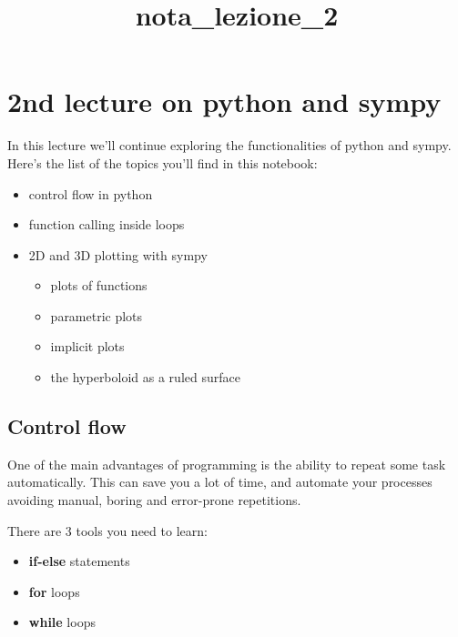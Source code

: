 \documentclass[11pt]{article}
\title{nota\_lezione\_2}
\providecommand{\tightlist}{%
      \setlength{\itemsep}{0pt}\setlength{\parskip}{0pt}}
\begin{document}
    
    \maketitle
    
    

    
    \hypertarget{nd-lecture-on-python-and-sympy}{%
\section{2nd lecture on python and
sympy}\label{nd-lecture-on-python-and-sympy}}

In this lecture we'll continue exploring the functionalities of python
and sympy. Here's the list of the topics you'll find in this notebook:

\begin{itemize}
\tightlist
\item
  control flow in python
\item
  function calling inside loops
\item
  2D and 3D plotting with sympy

  \begin{itemize}
  \tightlist
  \item
    plots of functions
  \item
    parametric plots
  \item
    implicit plots
  \item
    the hyperboloid as a ruled surface
  \end{itemize}
\end{itemize}

    \hypertarget{control-flow}{%
\subsection{Control flow}\label{control-flow}}

One of the main advantages of programming is the ability to repeat some
task automatically. This can save you a lot of time, and automate your
processes avoiding manual, boring and error-prone repetitions.

There are 3 tools you need to learn:

\begin{itemize}
\tightlist
\item
  \textbf{if-else} statements
\item
  \textbf{for} loops
\item
  \textbf{while} loops
\end{itemize}
\end{document}

